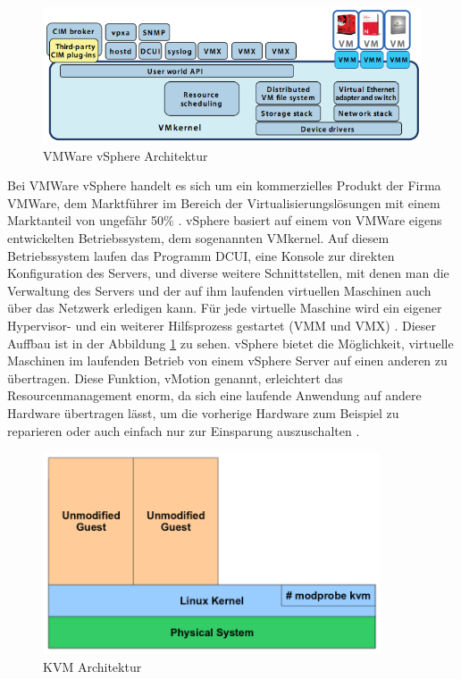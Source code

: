 \begin{figure}[!ht]
  \begin{center}
    \includegraphics[width=14cm]{bilder/vmware.png}
    \caption{VMWare vSphere Architektur \citep{vmware:002}}
    \label{vmware}
  \end{center}
\end{figure}

Bei VMWare vSphere handelt es sich um ein kommerzielles Produkt der Firma VMWare, dem Marktführer im Bereich der Virtualisierungslösungen mit einem Marktanteil von ungefähr 50\% \citep[Vgl.][]{vmware:001}. vSphere basiert auf einem von VMWare eigens entwickelten Betriebssystem, dem sogenannten VMkernel. Auf diesem Betriebssystem laufen das Programm \ac{DCUI}, eine Konsole zur direkten Konfiguration des Servers, und diverse weitere Schnittstellen, mit denen man die Verwaltung des Servers und der auf ihm laufenden virtuellen Maschinen auch über das Netzwerk erledigen kann. Für jede virtuelle Maschine wird ein eigener Hypervisor- und ein weiterer Hilfsprozess gestartet (VMM und VMX) \citep[Vgl.][S. 3]{vmware:002}. Dieser Auffbau ist in der Abbildung \ref{vmware} zu sehen. vSphere bietet die Möglichkeit, virtuelle Maschinen im laufenden Betrieb von einem vSphere Server auf einen anderen zu übertragen. Diese Funktion, vMotion genannt, erleichtert das Resourcenmanagement enorm, da sich eine laufende Anwendung auf andere Hardware übertragen lässt, um die vorherige Hardware zum Beispiel zu reparieren oder auch einfach nur zur Einsparung auszuschalten \citep[Vgl.][S. 4]{wmware:003}.

\begin{figure}[!ht]
  \begin{center}
    \includegraphics[width=10cm]{bilder/kvm.png}
    \caption{KVM Architektur \citep{kvm:002}}
    \label{kvm}
  \end{center}
\end{figure}

